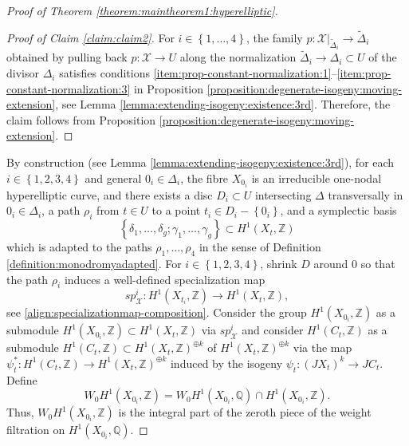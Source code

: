 \documentclass[a4paper,11pt,reqno]{amsart}
\numberwithin{equation}{section}
\theoremstyle{plain}
\theoremstyle{definition}
\newcommand{\Z}{\mathbb Z}
\newcommand{\Q}{\mathbb Q}
\newcommand{\ca}[1]{{\mathcal{#1}}}
\newcommand{\wt}[1]{{\widetilde{#1}}}
\newcommand{\set}[1]{\left\{ #1 \right\}}
\begin{document}
\begin{proof}[Proof of Theorem \ref{theorem:maintheorem1:hyperelliptic}]
\begin{proof}[Proof of Claim \ref{claim:claim2}]
For $i \in \set{1,\dotsc, 4}$, the family $p \colon \ca X|_{\wt \Delta_i} \to \wt \Delta_i$ obtained by pulling back $p \colon \ca X \to U$ along the normalization $\wt \Delta_i \to \Delta_i \subset U$ of the divisor $\Delta_i$ satisfies conditions \ref{item:prop-constant-normalization:1}--\ref{item:prop-constant-normalization:3} in Proposition \ref{proposition:degenerate-isogeny:moving-extension}, see Lemma \ref{lemma:extending-isogeny:existence:3rd}. Therefore, the claim follows from Proposition \ref{proposition:degenerate-isogeny:moving-extension}. 
\end{proof}
By construction (see Lemma \ref{lemma:extending-isogeny:existence:3rd}), for each $i  \in \set{1,2,3,4}$ and general $0_i \in \Delta_i$, the fibre $X_{0_i}$ is an irreducible one-nodal hyperelliptic curve, and there exists a disc $D_i \subset U$ intersecting $\Delta$ transversally in $0_i \in \Delta_i$, a path $\rho_i$ from $t \in U$ to a point $t_i \in D_i - \set{0_i}$, and a symplectic basis 
\[
\set{\delta_1, \dotsc, \delta_g; \gamma_1, \dotsc, \gamma_g} \subset H^1(X_t,\Z)
\]
which is adapted to the paths $\rho_1, \dotsc, \rho_4$ in the sense of Definition \ref{definition:monodromyadapted}. For $i \in \set{1,2,3,4}$, shrink $D$ around $0$ so that  the path $\rho_i$ induces a well-defined specialization map $$sp_{\ca X}^i \colon H^1(X_{t_i},\Z) \to H^1(X_{t},\Z),$$ see \eqref{align:specializationmap-composition}. Consider the group $H^1(X_{0_i},\Z)$ as a submodule
$
H^1(X_{0_i},\Z) \subset H^1(X_t,\Z)
$ via $sp_{\ca X}^i$ and consider $H^1(C_t,\Z)$ as a submodule
$
H^1(C_t,\Z) \subset H^1(X_t,\Z)^{\oplus k} 
$ of $H^1(X_t,\Z)^{\oplus k}$ via the map $\psi_t^\ast \colon H^1(C_t,\Z) \to H^1(X_t,\Z)^{\oplus k}$ induced by the isogeny $\psi_t \colon (JX_t)^k \to JC_t$. Define 
$$W_0H^1(X_{0_i},\Z) = W_0H^1(X_{0_i},\Q) \cap H^1(X_{0_i},\Z).$$ 
Thus, $W_0H^1(X_{0_i},\Z)$ is the integral part of the zeroth piece of the weight filtration on $H^1(X_{0_i},\Q)$. 


\end{proof}
\end{document}
